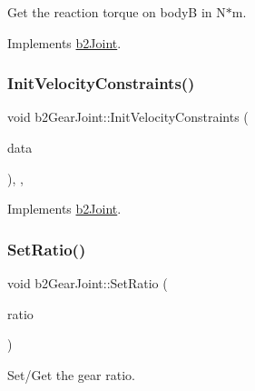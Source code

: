 Get the reaction torque on bodyB in N$\ast$m. 



Implements \mbox{\hyperlink{classb2_joint_ae355e441c2aa842777dc04e24f15ced0}{b2\+Joint}}.

\mbox{\label{classb2_gear_joint_ac3c76db6940bcb4c94d564960b9c57ab}} 
\subsubsection{\texorpdfstring{InitVelocityConstraints()}{InitVelocityConstraints()}}
{\footnotesize\ttfamily void b2\+Gear\+Joint\+::\+Init\+Velocity\+Constraints (\begin{DoxyParamCaption}\item[{const \mbox{\hyperlink{structb2_solver_data}{b2\+Solver\+Data}} \&}]{data }\end{DoxyParamCaption})\hspace{0.3cm}{\ttfamily [override]}, {\ttfamily [protected]}, {\ttfamily [virtual]}}



Implements \mbox{\hyperlink{classb2_joint_a599c013de5514e02684b958b31dd76a4}{b2\+Joint}}.

\mbox{\label{classb2_gear_joint_a21c867bdc00c15ade2f399d370f92636}} 
\subsubsection{\texorpdfstring{SetRatio()}{SetRatio()}}
{\footnotesize\ttfamily void b2\+Gear\+Joint\+::\+Set\+Ratio (\begin{DoxyParamCaption}\item[{\mbox{\hyperlink{b2_settings_8h_aacdc525d6f7bddb3ae95d5c311bd06a1}{float32}}}]{ratio }\end{DoxyParamCaption})}



Set/\+Get the gear ratio. 

\mbox{\label{classb2_gear_joint_a85633bbab3c4b4cb862bccce7e0253c2}} 
